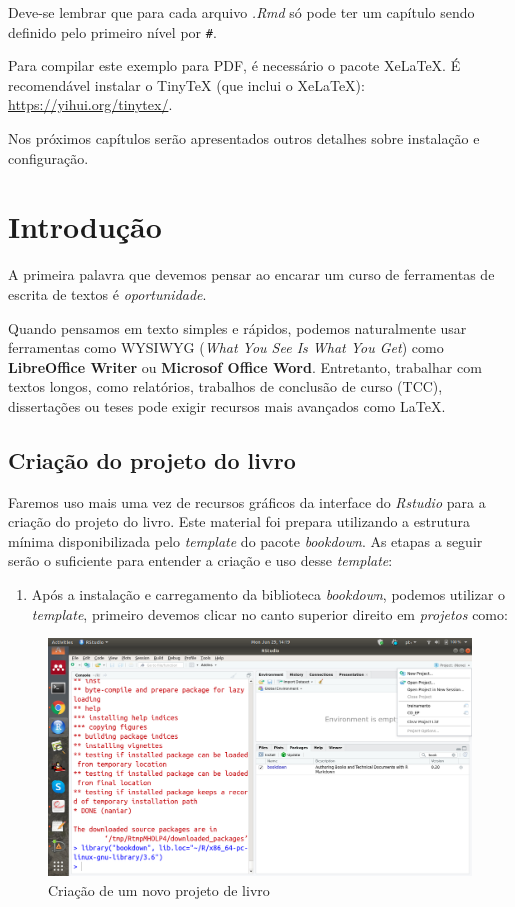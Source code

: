 \documentclass[]{book}
\providecommand{\tightlist}{%
  \setlength{\itemsep}{0pt}\setlength{\parskip}{0pt}}
\begin{document}
Deve-se lembrar que para cada arquivo \emph{.Rmd} só pode ter um
capítulo sendo definido pelo primeiro nível por \texttt{\#}.

Para compilar este exemplo para PDF, é necessário o pacote XeLaTeX. É
recomendável instalar o TinyTeX (que inclui o XeLaTeX):
\url{https://yihui.org/tinytex/}.

Nos próximos capítulos serão apresentados outros detalhes sobre
instalação e configuração.

\chapter{Introdução}\label{intro}

A primeira palavra que devemos pensar ao encarar um curso de ferramentas
de escrita de textos é \emph{oportunidade}.

Quando pensamos em texto simples e rápidos, podemos naturalmente usar
ferramentas como WYSIWYG (\emph{What You See Is What You Get}) como
\textbf{LibreOffice Writer} ou \textbf{Microsof Office Word}.
Entretanto, trabalhar com textos longos, como relatórios, trabalhos de
conclusão de curso (TCC), dissertações ou teses pode exigir recursos
mais avançados como LaTeX.

\section{Criação do projeto do
livro}\label{criauxe7uxe3o-do-projeto-do-livro}

Faremos uso mais uma vez de recursos gráficos da interface do
\emph{Rstudio} para a criação do projeto do livro. Este material foi
prepara utilizando a estrutura mínima disponibilizada pelo
\emph{template} do pacote \emph{bookdown}. As etapas a seguir serão o
suficiente para entender a criação e uso desse \emph{template}:

\begin{enumerate}
\def\labelenumi{\arabic{enumi}.}
\tightlist
\item
  Após a instalação e carregamento da biblioteca \emph{bookdown},
  podemos utilizar o \emph{template}, primeiro devemos clicar no canto
  superior direito em \emph{projetos} como:
\end{enumerate}

\begin{figure}
\centering
\includegraphics{fig/rstudio_select_new_Project.png}
\caption{Criação de um novo projeto de livro}
\end{figure}
\end{document}
